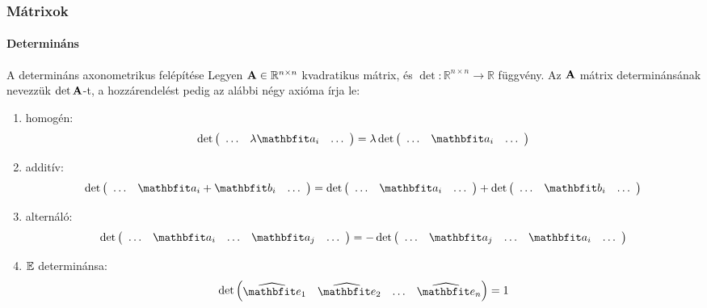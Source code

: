 \begin{frame}
  \frametitle{Mátrixok}
  \framesubtitle{Determináns}

  \begin{block}{A determináns axonometrikus felépítése}
    Legyen $\mathbf{A} \in \mathbb R^{n \times n}$ kvadratikus mátrix, és
    $\det: \mathbb R^{n \times n} \rightarrow \mathbb R$ függvény.
    Az $\mathbf{A}$ mátrix determinánsának nevezzük $\det \mathbf{A}$-t,
    a hozzárendelést pedig az alábbi négy axióma írja le:
    \newcommand\noskp{\vspace{-3mm}}
    \begin{enumerate}
      \item homogén:
            \[
              \edet{\lambda \rvec a_i} = \lambda \edet{\rvec a_i}
            \]
      \item \noskp additív:\noskp
            \[
              \edet{\rvec a_i + \rvec b_i} =
              \edet{\rvec a_i} + \edet{\rvec b_i}
            \]
      \item \noskp alternáló:\noskp
            \[
              \edet{\rvec a_i & \dots & \rvec a_j} =
              - \edet{\rvec a_j & \dots & \rvec a_i}
            \]
      \item \noskp ${\mathbb{E}}$ determinánsa:
            \[
              \det \begin{pmatrix}
                \uvec e_1 & \uvec e_2 & \dots & \uvec e_n
              \end{pmatrix} = 1
            \]
    \end{enumerate}
  \end{block}
\end{frame}

